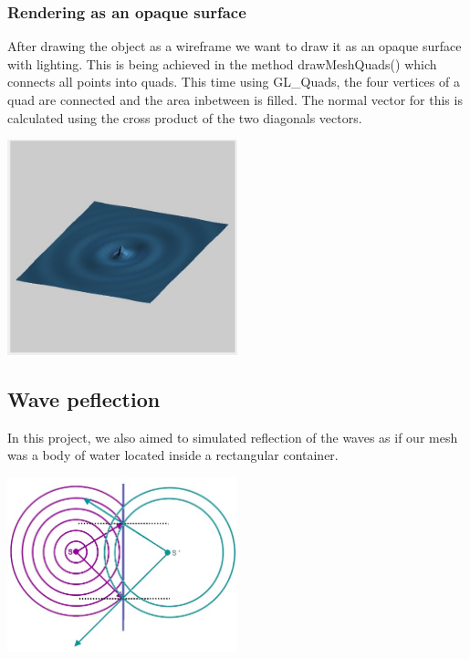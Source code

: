 \documentclass[12pt,a4paper]{scrartcl}
\begin{document}
\subsubsection{Rendering as an opaque surface}
After drawing the object as a wireframe we want to draw it as an opaque surface with lighting. This is being achieved in the method drawMeshQuads() which connects all points into quads. This time using GL_Quads, the four vertices of a quad are connected and the area inbetween is filled. The normal vector for this is calculated using the cross product of the two diagonals vectors.

\begin{center}
	\includegraphics[width=0.5\textwidth]{Images/RenderingOpaque.jpg}
\end{center} 

\subsection{Wave peflection}
In this project, we also aimed to simulated reflection of the waves as if our mesh was a body of water located inside a rectangular container.

\begin{center}
	\includegraphics[width=0.5\textwidth]{Images/Reflection.jpg}
\end{center}
\end{document}
